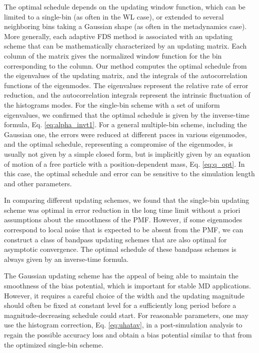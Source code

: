 \documentclass[reprint, superscriptaddress, floatfix]{revtex4-1}
\begin{document}
The optimal schedule depends on the updating window function,
which can be limited to a single-bin (as often in the WL case),
or extended to several neighboring bins
taking a Gaussian shape (as often in the metadynamics case).
%
More generally,
each adaptive FDS method is associated with
an updating scheme
that can be mathematically characterized
by an updating matrix.
%
Each column of the matrix gives the normalized
window function for the bin corresponding to the column.
%
Our method computes the optimal schedule from
the eigenvalues of the updating matrix,
and the integrals of the autocorrelation functions
of the eigenmodes.
%
The eigenvalues represent
the relative rate of error reduction,
and the autocorrelation integrals
represent the intrinsic fluctuation
of the histograms modes.
%
For the single-bin scheme with a set of uniform eigenvalues,
we confirmed that the optimal schedule
is given by the inverse-time formula,
Eq. \eqref{eq:alpha_invt1}.
%
For a general multiple-bin scheme,
including the Gaussian one,
the errors were reduced at different paces in various eigenmodes,
and the optimal schedule,
representing a compromise of the eigenmodes,
is usually not given by a simple closed form,
but is implicitly given by an equation of motion
of a free particle with a position-dependent mass,
Eq. \eqref{eq:q_opt}.
%
In this case,
the optimal schedule and error
can be sensitive to the simulation length
and other parameters.
%

In comparing different updating schemes,
we found that
the single-bin updating scheme was optimal
in error reduction
in the long time limit
without a priori assumptions
about the smoothness of the PMF.
%
However, if some eigenmodes
correspond to local noise
that is expected to be absent from the PMF,
we can construct a
class of bandpass updating schemes
that are also optimal for asymptotic convergence.
%
The optimal schedule of these bandpass schemes
is always given by an inverse-time formula.

The Gaussian updating scheme
has the appeal of being able to maintain the smoothness
of the bias potential,
which is important for stable MD applications.
%
However, it requires a careful choice of the width and
the updating magnitude should often be fixed at constant level
for a sufficiently long period before
a magnitude-decreasing schedule could start.
%
For reasonable parameters,
one may use the histogram correction,
Eq. \eqref{eq:uhatav},
in a post-simulation analysis
to regain the possible accuracy loss
and obtain a bias potential similar to
that from the optimized single-bin scheme.
\end{document}
